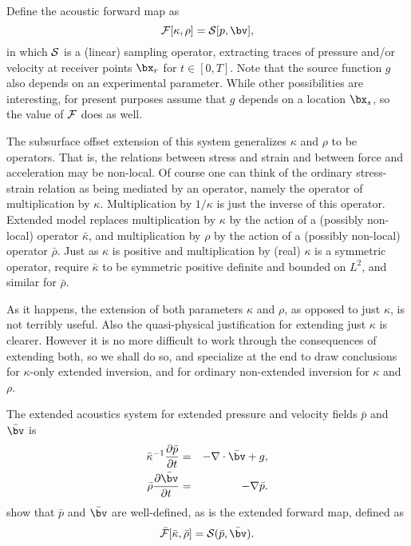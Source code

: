 Define the acoustic forward map as
\begin{equation}
\label{eqn:afm}
{\cal F}[\kappa,\rho] = {\cal S}[p,\bv],
\end{equation}
in which ${\cal S}$ is a (linear) sampling operator, extracting traces of pressure
and/or velocity at receiver points $\bx_r$ for $t \in [0,T]$. Note that
the source function $g$ also depends on an experimental
parameter. While other possibilities are interesting, for present
purposes assume that $g$ depends on a location $\bx_s$, so the value of
$\cal{F}$ does as well. 

The subsurface offset extension of this system generalizes $\kappa$
and $\rho$ to be operators. That is, the relations between stress
and strain and between force and acceleration may be non-local.
Of course one
can think of the ordinary stress-strain relation as being mediated by
an operator, namely  the operator of multiplication by
$\kappa$. Multiplication by $1/\kappa$ is just the inverse of this
operator. Extended model replaces multiplication by $\kappa$ by the
action of a (possibly non-local) operator $\bar{\kappa}$, and multiplication by
$\rho$ by the action of a (possibly non-local) operator $\bar{\rho}$. Just as $\kappa$ is
positive and multiplication by (real) $\kappa$ is a symmetric
operator, require $\bar{\kappa}$ to be symmetric positive
definite and bounded on $L^2$, and similar for $\bar{\rho}$.

As it happens, the extension of both parameters $\kappa$ and $\rho$,
as opposed to just $\kappa$, is not
terribly useful. Also the quasi-physical justification for extending just
$\kappa$ is clearer. However it is no more difficult to work through the
consequences of extending both, so we shall do so, and specialize at
the end to draw conclusions for $\kappa$-only extended inversion, and
for ordinary non-extended inversion for
$\kappa$ and $\rho$.

The extended acoustics system for extended pressure and velocity
fields $\bar{p}$ and $\bar{\bv}$ is
\begin{eqnarray}
\label{eqn:eawe}
\bar{\kappa}^{-1}\frac{\partial \bar{p}}{\partial t}& =& -\nabla \cdot
\bar{\bv} + g,\nonumber \\
\bar{\rho} \frac{\partial \bar{\bv}}{\partial t} & = & -\nabla \bar{p}.
\end{eqnarray}
\cite{BlazekStolkSymes:13} show that $\bar{p}$ and $\bar{\bv}$ are
well-defined, as is the extended forward map, defined as 
\begin{equation}
\label{eqn:eafm}
\bar{{\cal F}}[\bar{\kappa},\bar{\rho}] = {\cal S}(\bar{p},\bar{\bv}).
\end{equation}

